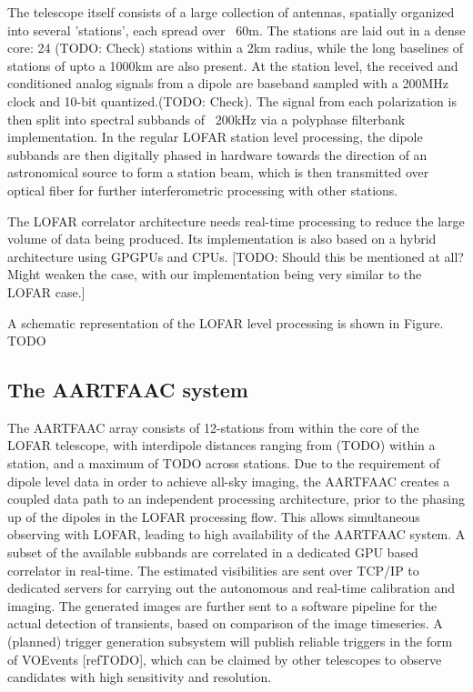 \documentclass{aa}
\begin{document}
The  telescope itself  consists of  a  large collection  of antennas,  spatially
organized into several 'stations', each spread  over ~60m. The stations are laid
out in a  dense core: 24 (TODO:  Check) stations within a 2km  radius, while the
long baselines  of stations of  upto a 1000km are  also present. At  the station
level, the  received and conditioned analog  signals from a dipole  are baseband
sampled with a 200MHz clock and  10-bit quantized.(TODO: Check). The signal from
each  polarization  is then  split  into  spectral  subbands  of ~200kHz  via  a
polyphase  filterbank  implementation.   In  the  regular  LOFAR  station  level
processing, the  dipole subbands are  then digitally phased in  hardware towards
the direction of  an astronomical source to  form a station beam,  which is then
transmitted over optical fiber for further interferometric processing with other
stations.

The LOFAR correlator architecture needs real-time processing to reduce the large
volume of  data being  produced. Its  implementation is also  based on  a hybrid
architecture using  GPGPUs and  CPUs. [TODO:  Should this  be mentioned  at all?
  Might weaken the case, with our implementation being very similar to the LOFAR
  case.]

A  schematic  representation   of  the  LOFAR  level  processing   is  shown  in
Figure. TODO

\subsection {\label{subsec:aartfaac}  The AARTFAAC system}
The AARTFAAC  array consists of  12-stations from within  the core of  the LOFAR
telescope, with interdipole distances ranging  from (TODO) within a station, and
a maximum of TODO across stations.  Due  to the requirement of dipole level data
in order to achieve all-sky imaging, the AARTFAAC creates a coupled data path to
an independent processing  architecture, prior to the phasing up  of the dipoles
in the  LOFAR processing  flow. This allows  simultaneous observing  with LOFAR,
leading to high  availability of the AARTFAAC system. A  subset of the available
subbands are  correlated in a dedicated  GPU based correlator in  real-time. The
estimated visibilities  are sent over  TCP/IP to dedicated servers  for carrying
out the autonomous and real-time  calibration and imaging.  The generated images
are further sent to a software  pipeline for the actual detection of transients,
based on  comparison of  the image timeseries.   A (planned)  trigger generation
subsystem  will publish  reliable triggers  in the  form of  VOEvents [refTODO],
which  can be  claimed  by  other telescopes  to  observe  candidates with  high
sensitivity and resolution.
\end{document}
